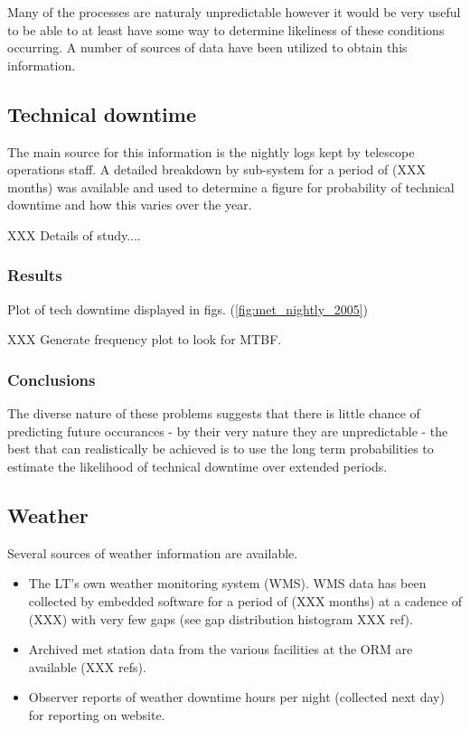 Many of the processes are naturaly unpredictable however it would be very useful to be able to at least have some way to determine likeliness of these conditions occurring. A number of sources of data have been utilized to obtain this information.

\subsection{Technical downtime}
The main source for this information is the nightly logs kept by telescope operations staff. A detailed breakdown by sub-system for a period of (XXX months) was available and used to determine a figure for probability of technical downtime and how this varies over the year.

XXX Details of study....
\subsubsection{Results}

Plot of tech downtime displayed in figs. (\ref{fig:met_nightly_2005}) 

XXX Generate frequency plot to look for MTBF.

\subsubsection{Conclusions}
The diverse nature of these problems suggests that there is little chance of predicting future occurances - by their very nature they are unpredictable - the best that can realistically be achieved is to use the long term probabilities to estimate the likelihood of technical downtime over extended periods. 

\subsection{Weather}
Several sources of weather information are available.
\begin{itemize}
\item The LT's own weather monitoring system (WMS). WMS data has been collected by embedded software for a period of (XXX months) at a cadence of (XXX) with very few gaps (see gap distribution histogram XXX ref).
\item Archived met station data from the various facilities at the ORM are available (XXX refs).
\item Observer reports of weather downtime hours per night (collected next day) for reporting on website.
\end{itemize}


